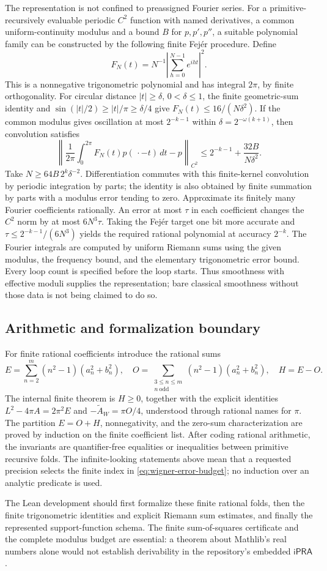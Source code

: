 The representation is not confined to preassigned Fourier series.
For a primitive-recursively evaluable periodic \(C^2\) function
with named derivatives, a common uniform-continuity modulus and
a bound \(B\) for \(p,p',p''\), a suitable polynomial family
can be constructed by the following finite Fej\'er procedure.
Define
\[
 F_N(t)=N^{-1}\left|\sum_{h=0}^{N-1}e^{iht}\right|^2.
\]
This is a nonnegative trigonometric polynomial and has integral
\(2\pi\), by finite orthogonality.  For circular distance
\(|t|\ge\delta\), \(0<\delta\le1\), the finite geometric-sum
identity and \(\sin(|t|/2)\ge|t|/\pi\ge\delta/4\) give
\(F_N(t)\le16/(N\delta^2)\).
If the common modulus gives oscillation at most \(2^{-k-1}\)
within \(\delta=2^{-\omega(k+1)}\), then convolution satisfies
\[
 \left\|\frac1{2\pi}\int_0^{2\pi}F_N(t)p(\,\cdot-t)\,dt-p
          \right\|_{C^2}
 \le2^{-k-1}+\frac{32B}{N\delta^2}.
\]
Take \(N\ge64B\,2^k\delta^{-2}\).
Differentiation commutes with this finite-kernel convolution by
periodic integration by parts; the identity is also obtained by
finite summation by parts with a modulus error tending to zero.
Approximate its finitely many Fourier coefficients rationally.
An error at most \(\tau\) in each coefficient changes the
\(C^2\) norm by at most \(6N^3\tau\).  Taking the Fej\'er
target one bit more accurate and
\(\tau\le2^{-k-1}/(6N^3)\) yields the required rational
polynomial at accuracy \(2^{-k}\).
The Fourier integrals are computed by uniform Riemann sums using
the given modulus, the frequency bound, and the elementary
trigonometric error bound.  Every loop count is specified before
the loop starts.  Thus smoothness with effective moduli supplies
the representation; bare classical smoothness without those data
is not being claimed to do so.

\subsection{Arithmetic and formalization boundary}
For finite rational coefficients introduce the rational sums
\[
 E=\sum_{n=2}^m(n^2-1)(a_n^2+b_n^2),\quad
 O=\sum_{\substack{3\le n\le m\\n\ \text{odd}}}
          (n^2-1)(a_n^2+b_n^2),\quad H=E-O.
\]
The internal finite theorem is \(H\ge0\), together with the
explicit identities \(L^2-4\pi A=2\pi^2E\) and
\(-\widetilde A_W=\pi O/4\), understood through rational
names for \(\pi\).  The partition \(E=O+H\), nonnegativity,
and the zero-sum characterization are proved by induction on the
finite coefficient list.  After coding rational arithmetic, the
invariants are quantifier-free equalities or inequalities between
primitive recursive folds.  The infinite-looking statements above
mean that a requested precision selects the finite index in
\eqref{eq:wigner-error-budget}; no induction over an analytic
predicate is used.

The Lean development should first formalize these finite rational
folds, then the finite trigonometric identities and explicit Riemann
sum estimates, and finally the represented support-function schema.
The finite sum-of-squares certificate and the complete modulus budget
are essential: a theorem about Mathlib's real numbers alone would
not establish derivability in the repository's embedded
\(\mathsf{iPRA}\).
